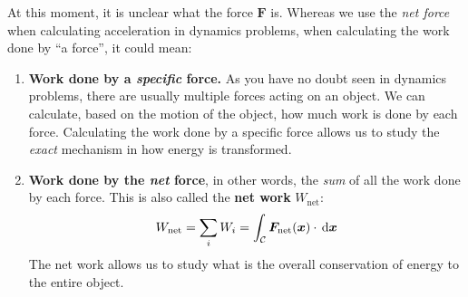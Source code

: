 At this moment, it is unclear what the force $\bm F$ is. Whereas we use the
\emph{net force} when calculating acceleration in dynamics problems, when
calculating the work done by ``a force'', it could mean:
\begin{enumerate}[leftmargin=12pt]
\item\textbf{Work done by a \emph{specific} force.} As you have no doubt seen
  in dynamics problems, there are usually multiple forces acting on an object.
  We can calculate, based on the motion of the object, how much work is done by
  each force. Calculating the work done by a specific force allows us to study
  the \emph{exact} mechanism in how energy is transformed.
  
\item\textbf{Work done by the \emph{net} force}, in other words, the \emph{sum}
  of all the work done by each force. This is also called the \textbf{net work}
  $W_\text{net}$:
  \begin{equation*}
    W_\text{net}
    = \sum_i W_i
    =\int_{\mathcal C}\bm F_\text{net}(\bm x)\cdot\dl{\bm x}
  \end{equation*}
  The net work allows us to study what is the overall conservation of energy
  to the entire object.
\end{enumerate}

